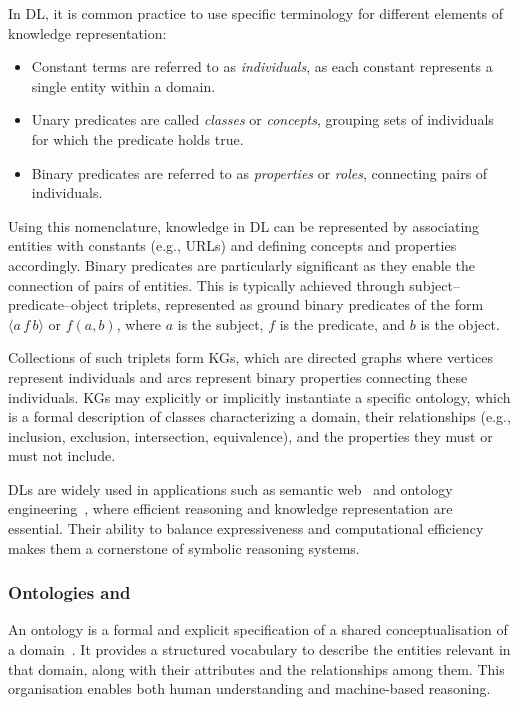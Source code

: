 In \gls{DL}, it is common practice to use specific terminology for different elements of knowledge representation:
%
\begin{itemize}
    \item Constant terms are referred to as \textit{individuals}, as each constant represents a single entity within a domain.
    \item Unary predicates are called \textit{classes} or \textit{concepts}, grouping sets of individuals for which the predicate holds true.
    \item Binary predicates are referred to as \textit{properties} or \textit{roles}, connecting pairs of individuals.
\end{itemize}
%

Using this nomenclature, knowledge in \gls{DL} can be represented by associating entities with constants (e.g., URLs) and defining concepts and properties accordingly.
%
Binary predicates are particularly significant as they enable the connection of pairs of entities.
%
This is typically achieved through subject–predicate–object triplets, represented as ground binary predicates of the form \(\langle a \, f \, b\rangle\) or \(f(a, b)\), where \(a\) is the subject, \(f\) is the predicate, and \(b\) is the object.

Collections of such triplets form \glspl{KG}, which are directed graphs where vertices represent individuals and arcs represent binary properties connecting these individuals.
%
\glspl{KG} may explicitly or implicitly instantiate a specific ontology, which is a formal description of classes characterizing a domain, their relationships (e.g., inclusion, exclusion, intersection, equivalence), and the properties they must or must not include.


\glspl{DL} are widely used in applications such as semantic web~\cite{DBLP:conf/coopis/GangemiM03} and ontology engineering~\cite{DBLP:books/ios/HGJKP2016}, where efficient reasoning and knowledge representation are essential.
%
Their ability to balance expressiveness and computational efficiency makes them a cornerstone of symbolic reasoning systems.


\subsubsection[Ontologies and knowledge graph]{Ontologies and }\label{subsubsec:ontologies-and-kg}
%
An ontology is a formal and explicit specification of a shared conceptualisation of a domain~\cite{DBLP:books/daglib/p/Grimm10}.
%
It provides a structured vocabulary to describe the entities relevant in that domain, along with their attributes and the relationships among them.
%
This organisation enables both human understanding and machine-based reasoning.

